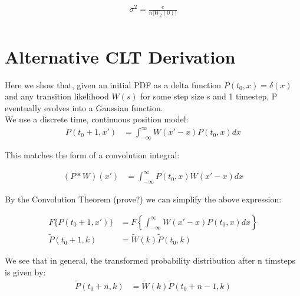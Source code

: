 \documentclass[10pt]{article} %
\begin{document}
\begin{align}
  \sigma^2 = \frac{e}{n|W_2(0)|}\\
\end{align}



\section{Alternative CLT Derivation}
Here we show that, given an initial PDF as a delta function $P(t_0,x) = \delta(x)$
and any transition likelihood $W(s)$ for some step size s and 1 timestep, P
eventually evolves into a Gaussian function.\\

We use a discrete time, continuous position model:\\

\begin{align}
  P(t_0+1,x') &= \int_{-\infty}^{\infty}W(x'-x)P(t_0,x)dx
\end{align}

This matches the form of a convolution integral:

\begin{align*}
  (P*W)(x') &= \int_{-\infty}^{\infty}P(t_0,x)W(x'-x)dx
\end{align*}

By the Convolution Theorem (prove?) we can simplify the above expression:

\begin{align}
  F\{P(t_0+1,x')\} &= F\left\{\int_{-\infty}^{\infty}W(x'-x)P(t_0,x)dx\right\}\\
  \widetilde{P}(t_0+1,k) &= \widetilde{W}(k)\widetilde{P}(t_0,k)
\end{align}

We see that in general, the transformed probability distribution after n
timsteps is given by:\\

\begin{align}
  \widetilde{P}(t_0+n,k) &= \widetilde{W}(k)\widetilde{P}(t_0+n-1,k)
\end{align}
\end{document}
